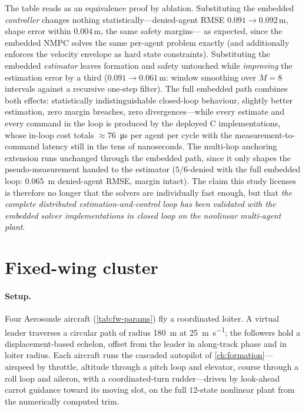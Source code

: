 The table reads as an equivalence proof by ablation. Substituting the embedded
\emph{controller} changes nothing statistically---denied-agent RMSE
$0.091\to0.092$\,m, shape error within $0.004$\,m, the same safety margins---%
as expected, since the embedded NMPC solves the same per-agent problem exactly
(and additionally enforces the velocity envelope as hard state constraints).
Substituting the embedded \emph{estimator} leaves formation and safety
untouched while \emph{improving} the estimation error by a third
($0.091\to0.061$\,m: window smoothing over $M{=}8$ intervals against a
recursive one-step filter). The full embedded path combines both effects:
statistically indistinguishable closed-loop behaviour, slightly better
estimation, zero margin breaches, zero divergences---while every estimate and
every command in the loop is produced by the deployed C implementations, whose
in-loop cost totals $\approx$\SI{76}{\micro\second} per agent per cycle with
the measurement-to-command latency still in the tens of nanoseconds. The
multi-hop anchoring extension runs unchanged through the embedded path, since
it only shapes the pseudo-measurement handed to the estimator
($5/6$-denied with the full embedded loop: \SI{0.065}{\meter} denied-agent
RMSE, margin intact). The claim this study licenses is therefore no longer that
the solvers are individually fast enough, but that \emph{the complete
distributed estimation-and-control loop has been validated with the embedded
solver implementations in closed loop on the nonlinear multi-agent plant}.

\section{Fixed-wing cluster}
\label{sec:sim-fw}

\paragraph{Setup.} Four Aerosonde aircraft (\cref{tab:fw-params}) fly a
coordinated loiter. A virtual leader traverses a circular path of radius
\SI{180}{\meter} at \SI{25}{\meter\per\second}; the followers hold a
displacement-based echelon, offset from the leader in along-track phase and in
loiter radius. Each aircraft runs the cascaded autopilot of \cref{ch:formation}---%
airspeed by throttle, altitude through a pitch loop and elevator, course through a
roll loop and aileron, with a coordinated-turn rudder---driven by look-ahead
carrot guidance toward its moving slot, on the full $12$-state nonlinear plant
from the numerically computed trim.

